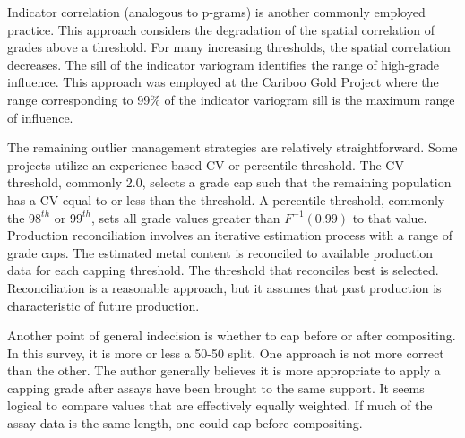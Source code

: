 
Indicator correlation (analogous to p-grams) is another commonly employed practice. This approach considers the degradation of the spatial correlation of grades above a threshold. For many increasing thresholds, the spatial correlation decreases. The sill of the indicator variogram identifies the range of high-grade influence. This approach was employed at the Cariboo Gold Project \citep{osiko2020} where the range corresponding to 99\% of the indicator variogram sill is the maximum range of influence.


The remaining outlier management strategies are relatively straightforward. Some projects utilize an experience-based \gls{CV} or percentile threshold. The \gls{CV} threshold, commonly 2.0, selects a grade cap such that the remaining population has a \gls{CV} equal to or less than the threshold. A percentile threshold, commonly the $98^{th}$ or $99^{th}$, sets all grade values greater than $F^{-1}(0.99)$ to that value. Production reconciliation involves an iterative estimation process with a range of grade caps. The estimated metal content is reconciled to available production data for each capping threshold. The threshold that reconciles best is selected. Reconciliation is a reasonable approach, but it assumes that past production is characteristic of future production.

Another point of general indecision is whether to cap before or after compositing. In this survey, it is more or less a 50-50 split. One approach is not more correct than the other. The author generally believes it is more appropriate to apply a capping grade after assays have been brought to the same support. It seems logical to compare values that are effectively equally weighted. If much of the assay data is the same length, one could cap before compositing.

